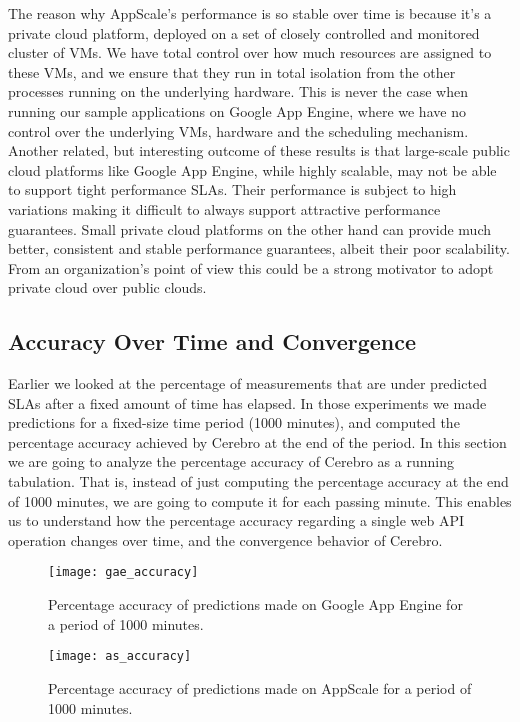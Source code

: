 The reason why AppScale's performance is so stable over time is because it's a private cloud platform, deployed on a set of closely controlled 
and monitored cluster of VMs. We have total control
over how much resources are assigned to these VMs, and we ensure that they run in total isolation from the other processes running on the underlying hardware.
This is never the case when running our sample applications on Google App Engine, where we have no control over the underlying VMs, hardware and the
scheduling mechanism. Another related, but interesting outcome of these results is that large-scale public cloud platforms like Google App Engine, while
highly scalable, may not be able to support tight performance SLAs. Their performance is subject to high variations making it difficult to always support attractive
performance guarantees. Small private cloud platforms on the other hand can provide much better, consistent and stable performance guarantees, albeit their
poor scalability. From an organization's point of view this could be a strong motivator to adopt private cloud over public clouds.

\subsection{Accuracy Over Time and Convergence}
Earlier we looked at the percentage of measurements that are under predicted SLAs after a fixed amount of time has elapsed.
In those experiments we made predictions for a fixed-size time period (1000 minutes), 
and computed the percentage accuracy achieved by Cerebro at the end of the period.
In this section we are going to analyze the percentage accuracy of Cerebro as a running tabulation. That is, instead of just
computing the percentage accuracy at the end of 1000 minutes, we are going to compute it for each passing minute. This enables us to
understand how the percentage accuracy regarding a single web API operation changes over time, and the convergence
behavior of Cerebro.

\begin{figure}
\centering
\texttt{[image: gae\_accuracy]}
\caption{Percentage accuracy of predictions made on Google App Engine for a period of 1000 minutes.}
\label{fig:gae_accuracy}
\end{figure}

\begin{figure}
\centering
\texttt{[image: as\_accuracy]}
\caption{Percentage accuracy of predictions made on AppScale for a period of 1000 minutes.}
\label{fig:as_accuracy}
\end{figure}

